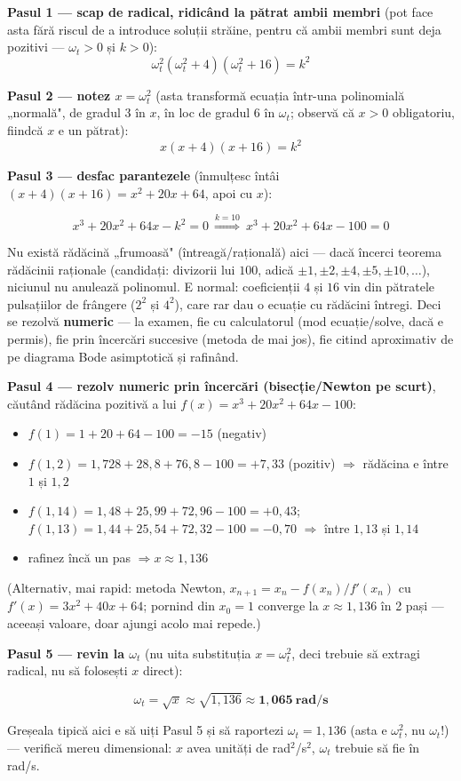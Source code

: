 \documentclass[10pt,a4paper]{article}
\newcommand{\tip}[1]{\textcolor{blue!55!black}{#1}}
\begin{document}
\textbf{Pasul 1 — scap de radical, ridicând la pătrat ambii membri} (pot face asta fără riscul de a introduce soluții străine, pentru că ambii membri sunt deja pozitivi — $\omega_t{>}0$ și $k{>}0$):
$$\omega_t^2(\omega_t^2{+}4)(\omega_t^2{+}16)=k^2$$

\textbf{Pasul 2 — notez $x{=}\omega_t^2$} (asta transformă ecuația într-una polinomială „normală", de gradul 3 în $x$, în loc de gradul 6 în $\omega_t$; observă că $x{>}0$ obligatoriu, fiindcă $x$ e un pătrat):
$$x(x{+}4)(x{+}16)=k^2$$

\textbf{Pasul 3 — desfac parantezele} (înmulțesc întâi $(x{+}4)(x{+}16){=}x^2{+}20x{+}64$, apoi cu $x$):
\begin{keyeq}\color{red!65!black}
$$x^3+20x^2+64x-k^2=0\ \overset{k=10}{\Longrightarrow}\ x^3+20x^2+64x-100=0$$
\end{keyeq}

\tip{Nu există rădăcină „frumoasă" (întreagă/rațională) aici — dacă încerci teorema rădăcinii raționale (candidați: divizorii lui $100$, adică $\pm1,\pm2,\pm4,\pm5,\pm10,\ldots$), niciunul nu anulează polinomul. E normal: coeficienții $4$ și $16$ vin din pătratele pulsațiilor de frângere ($2^2$ și $4^2$), care rar dau o ecuație cu rădăcini întregi. Deci se rezolvă \textbf{numeric} — la examen, fie cu calculatorul (mod ecuație/solve, dacă e permis), fie prin încercări succesive (metoda de mai jos), fie citind aproximativ de pe diagrama Bode asimptotică și rafinând.}

\textbf{Pasul 4 — rezolv numeric prin încercări (bisecție/Newton pe scurt)}, căutând rădăcina pozitivă a lui $f(x){=}x^3{+}20x^2{+}64x{-}100$:
\begin{itemize}
\item $f(1)=1{+}20{+}64{-}100={-}15$ (negativ)
\item $f(1{,}2)=1{,}728{+}28{,}8{+}76{,}8{-}100={+}7{,}33$ (pozitiv) $\Rightarrow$ rădăcina e între $1$ și $1{,}2$
\item $f(1{,}14)=1{,}48{+}25{,}99{+}72{,}96{-}100={+}0{,}43$; $f(1{,}13)=1{,}44{+}25{,}54{+}72{,}32{-}100={-}0{,}70$ $\Rightarrow$ între $1{,}13$ și $1{,}14$
\item rafinez încă un pas $\Rightarrow x\approx1{,}136$
\end{itemize}
(Alternativ, mai rapid: metoda Newton, $x_{n+1}{=}x_n{-}f(x_n)/f'(x_n)$ cu $f'(x){=}3x^2{+}40x{+}64$; pornind din $x_0{=}1$ converge la $x\approx1{,}136$ în 2 pași — aceeași valoare, doar ajungi acolo mai repede.)

\textbf{Pasul 5 — revin la $\omega_t$} (nu uita substituția $x{=}\omega_t^2$, deci trebuie să extragi radical, nu să folosești $x$ direct):
\begin{keyeq}\color{red!65!black}
$$\omega_t=\sqrt{x}\approx\sqrt{1{,}136}\approx\mathbf{1{,}065\ rad/s}$$
\end{keyeq}
\tip{Greșeala tipică aici e să uiți Pasul 5 și să raportezi $\omega_t{=}1{,}136$ (asta e $\omega_t^2$, nu $\omega_t$!) — verifică mereu dimensional: $x$ avea unități de rad$^2$/s$^2$, $\omega_t$ trebuie să fie în rad/s.}
\end{document}
